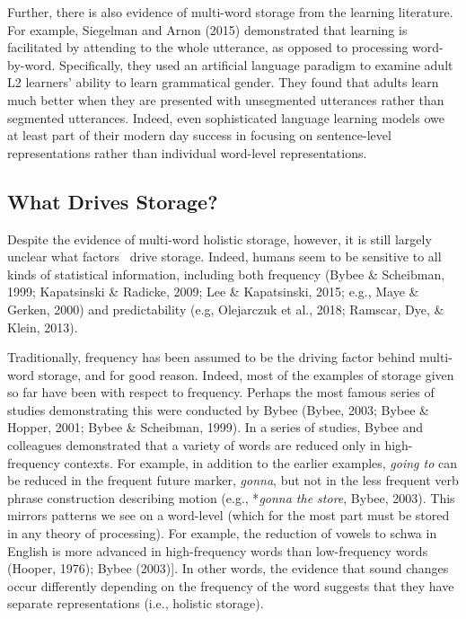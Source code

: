 \documentclass[
  man,floatsintext]{apa6}
\begin{document}
Further, there is also evidence of multi-word storage from the learning literature. For example, Siegelman and Arnon (2015) demonstrated that learning is facilitated by attending to the whole utterance, as opposed to processing word-by-word. Specifically, they used an artificial language paradigm to examine adult L2 learners' ability to learn grammatical gender. They found that adults learn much better when they are presented with unsegmented utterances rather than segmented utterances. Indeed, even sophisticated language learning models owe at least part of their modern day success in focusing on sentence-level representations rather than individual word-level representations.

\hypertarget{what-drives-storage}{%
\subsection{What Drives Storage?}\label{what-drives-storage}}

Despite the evidence of multi-word holistic storage, however, it is still largely unclear what factors~ drive storage. Indeed, humans seem to be sensitive to all kinds of statistical information, including both frequency (Bybee \& Scheibman, 1999; Kapatsinski \& Radicke, 2009; Lee \& Kapatsinski, 2015; e.g., Maye \& Gerken, 2000) and predictability (e.g, Olejarczuk et al., 2018; Ramscar, Dye, \& Klein, 2013).

Traditionally, frequency has been assumed to be the driving factor behind multi-word storage, and for good reason. Indeed, most of the examples of storage given so far have been with respect to frequency. Perhaps the most famous series of studies demonstrating this were conducted by Bybee (Bybee, 2003; Bybee \& Hopper, 2001; Bybee \& Scheibman, 1999). In a series of studies, Bybee and colleagues demonstrated that a variety of words are reduced only in high-frequency contexts. For example, in addition to the earlier examples, \emph{going to} can be reduced in the frequent future marker, \emph{gonna}, but not in the less frequent verb phrase construction describing motion (e.g., *\emph{gonna the store}, Bybee, 2003). This mirrors patterns we see on a word-level (which for the most part must be stored in any theory of processing). For example, the reduction of vowels to schwa in English is more advanced in high-frequency words than low-frequency words (Hooper, 1976); Bybee (2003){]}. In other words, the evidence that sound changes occur differently depending on the frequency of the word suggests that they have separate representations (i.e., holistic storage).
\end{document}
